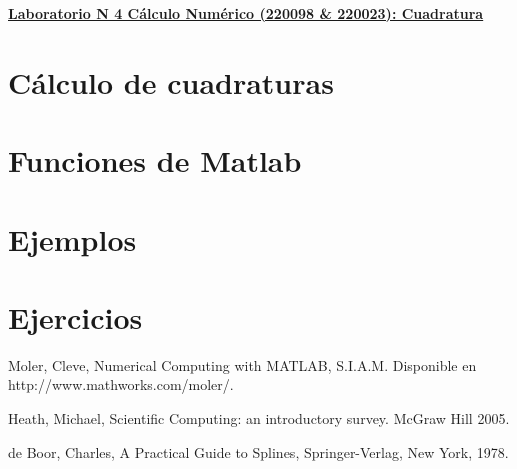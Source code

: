 \documentclass[12pt,letterpaper]{article}
\begin{document}
\hspace*{-1,5cm}

\vspace*{0.1cm} \centerline {\bf\underline{Laboratorio N 4 C\'alculo Num\'erico (220098 \& 220023): Cuadratura}} \vskip0.5cm

\section{C\'alculo de cuadraturas}

\section{Funciones de Matlab}

\section{Ejemplos}

\section{Ejercicios}

\begin{thebibliography}{9}


 Moler, Cleve, Numerical Computing with MATLAB, S.I.A.M. Disponible en http://www.mathworks.com/moler/.

 Heath, Michael, Scientific Computing: an introductory survey. McGraw Hill 2005.

 de Boor, Charles, A Practical Guide to Splines, Springer-Verlag, New York, 1978.


\end{thebibliography}
\end{document}
